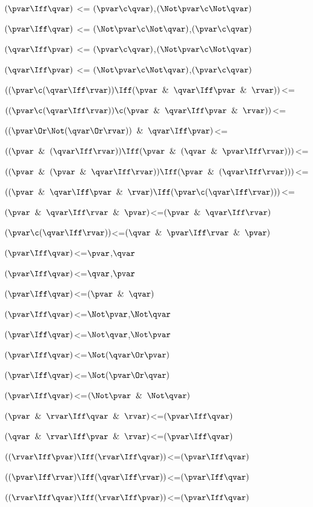 $(\pvar \Iff \qvar)$ <= $(\pvar \c \qvar)$,$(\Not\pvar \c \Not\qvar)$

$(\pvar \Iff \qvar)$ <= $(\Not\pvar \c \Not\qvar)$,$(\pvar \c \qvar)$

$(\qvar \Iff \pvar)$ <= $(\pvar \c \qvar)$,$(\Not\pvar \c \Not\qvar)$

$(\qvar \Iff \pvar)$ <= $(\Not\pvar \c \Not\qvar)$,$(\pvar \c \qvar)$

$((\pvar \c (\qvar \Iff \rvar)) \Iff (\pvar \And \qvar \Iff \pvar \And \rvar))$<=

$((\pvar \c (\qvar \Iff \rvar)) \c (\pvar \And \qvar \Iff \pvar \And \rvar))$<=

$((\pvar \Or \Not(\qvar \Or \rvar)) \And \qvar \Iff \pvar)$<=

$((\pvar \And (\qvar \Iff \rvar)) \Iff (\pvar \And (\qvar \And \pvar \Iff \rvar)))$<=

$((\pvar \And (\pvar \And \qvar \Iff \rvar)) \Iff (\pvar \And (\qvar \Iff \rvar)))$<=

$((\pvar \And \qvar \Iff \pvar \And \rvar) \Iff (\pvar \c (\qvar \Iff \rvar)))$<=

$(\pvar \And \qvar \Iff \rvar \And \pvar)$<=$(\pvar \And \qvar \Iff \rvar)$

$(\pvar \c (\qvar \Iff \rvar))$<=$(\qvar \And \pvar \Iff \rvar \And \pvar)$

$(\pvar \Iff \qvar)$<=$\pvar$,$\qvar$

$(\pvar \Iff \qvar)$<=$\qvar$,$\pvar$

$(\pvar \Iff \qvar)$<=$(\pvar \And \qvar)$

$(\pvar \Iff \qvar)$<=$\Not \pvar$,$\Not \qvar$

$(\pvar \Iff \qvar)$<=$\Not \qvar$,$\Not \pvar$

$(\pvar \Iff \qvar)$<=$\Not(\qvar \Or \pvar)$

$(\pvar \Iff \qvar)$<=$\Not(\pvar \Or \qvar)$

$(\pvar \Iff \qvar)$<=$ (\Not \pvar \And  \Not \qvar)$

$(\pvar \And \rvar \Iff \qvar \And \rvar)$<=$(\pvar \Iff \qvar)$

$(\qvar \And \rvar \Iff \pvar \And \rvar)$<=$(\pvar \Iff \qvar)$

$((\rvar \Iff \pvar) \Iff (\rvar \Iff \qvar))$<=$(\pvar \Iff \qvar)$

$((\pvar \Iff \rvar) \Iff (\qvar \Iff \rvar))$<=$(\pvar \Iff \qvar)$

$((\rvar \Iff \qvar) \Iff (\rvar \Iff \pvar))$<=$(\pvar \Iff \qvar)$

